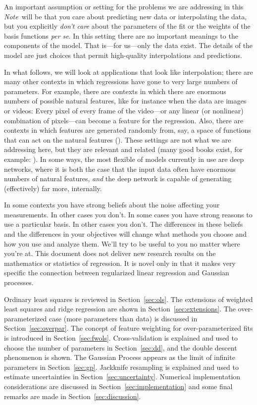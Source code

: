 \documentclass[12pt,letterpaper]{article}
\newcommand{\documentname}{\textsl{Note}}
\newcommand{\sectionname}{Section}
\newcommand{\foreign}[1]{\textsl{#1}}
\begin{document}
An important assumption or setting for the problems we are addressing in this \documentname\ will be that you care about predicting new data or interpolating the data, but you explicitly \emph{don't care} about the parameters of the fit or the weights of the basis functions \foreign{per se}.
In this setting there are no important meanings to the components of the model.
That is---for us---only the data exist.
The details of the model are just choices that permit high-quality interpolations and predictions.

In what follows, we will look at applications that look like interpolation; there are many other contexts in which regressions have gone to very large numbers of parameters.
For example, there are contexts in which there are enormous numbers of possible natural features, like for instance when the data are images or videos: Every pixel of every frame of the video---or any linear (or nonlinear) combination of pixels---can become a feature for the regression.
Also, there are contexts in which features are generated randomly from, say, a space of functions that can act on the natural features (\citealt{rahimi2007random}).
These settings are not what we are addressing here, but they are relevant and related
(many good books exist, for example: \citealt{bishop, esl, agresti, gelman}).
In some ways, the most flexible of models currently in use are deep networks, where it is both the case that the input data often have enormous numbers of natural features, \emph{and} the deep network is capable of generating (effectively) far more, internally.

In some contexts you have strong beliefs about the noise affecting your measurements. In other cases you don't.
In some cases you have strong reasons to use a particular basis.
In other cases you don't.
The differences in these beliefs and the differences in your objectives will change what methods you choose and how you use and analyze them.
We'll try to be useful to you no matter where you're at.
This document does not deliver new research results on the mathematics or statistics of regression.
It is novel only in that it makes very specific the connection between regularized linear regression and Gaussian processes.

Ordinary least squares is reviewed in \sectionname~\ref{sec:ols}.
The extensions of weighted least squares and ridge regression are shown in \sectionname~\ref{sec:extensions}.
The over-para\-meterized case (more parameters than data) is discussed in \sectionname~\ref{sec:overpar}.
The concept of feature weighting for over-parameterized fits is introduced in \sectionname~\ref{sec:fwols}.
Cross-validation is explained and used to choose the number of parameters in \sectionname~\ref{sec:dd}, and the double descent phenomenon is shown.
The Gaussian Process appears as the limit of infinite parameters in \sectionname~\ref{sec:gp}.
Jackknife resampling is explained and used to estimate uncertainties in \sectionname~\ref{sec:uncertainty}.
Numerical implementation considerations are discussed in \sectionname~\ref{sec:implementation} and some final remarks are made in \sectionname~\ref{sec:discussion}.
\end{document}
